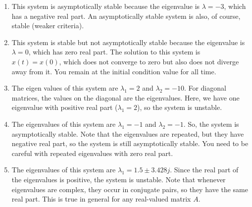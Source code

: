 \documentclass{ee122_notes}
\begin{document}
\begin{popquiz}
\begin{center}
\begin{tabular}
\end{tabular}
\end{center}
\popqsplit 
\begin{enumerate}
    \item This system is asymptotically stable because the eigenvalue is $\lambda = -3$, which has a negative real part. An asymptotically stable system is also, of course, stable (weaker criteria). 
    \item This system is stable but not asymptotically stable because the eigenvalue is $\lambda = 0$, which has zero real part. The solution to this system is $x(t) = x(0)$, which does not converge to zero but also does not diverge away from it. You remain at the initial condition value for all time. 
    \item The eigen values of this system are $\lambda_1 = 2$ and $\lambda_2 = -10$. For diagonal matrices, the values on the diagonal are the eigenvalues. Here, we have one eigenvalue with positive real part ($\lambda_1 = 2$), so the system is unstable.
    \item The eigenvalues of this system are $\lambda_1 = -1$ and $\lambda_2 = -1$. So, the system is asymptotically stable. Note that the eigenvalues are repeated, but they have negative real part, so the system is still asymptotically stable. You need to be careful with repeated eigenvalues with zero real part.
    \item The eigenvalues of this system are $\lambda_1 = 1.5 \pm 3.428j$. Since the real part of the eigenvalues is positive, the system is unstable. Note that whenever eigenvalues are complex, they occur in conjugate pairs, so they have the same real part. This is true in general for any real-valued matrix $A$.
\end{enumerate}
\end{popquiz}
\end{document}
